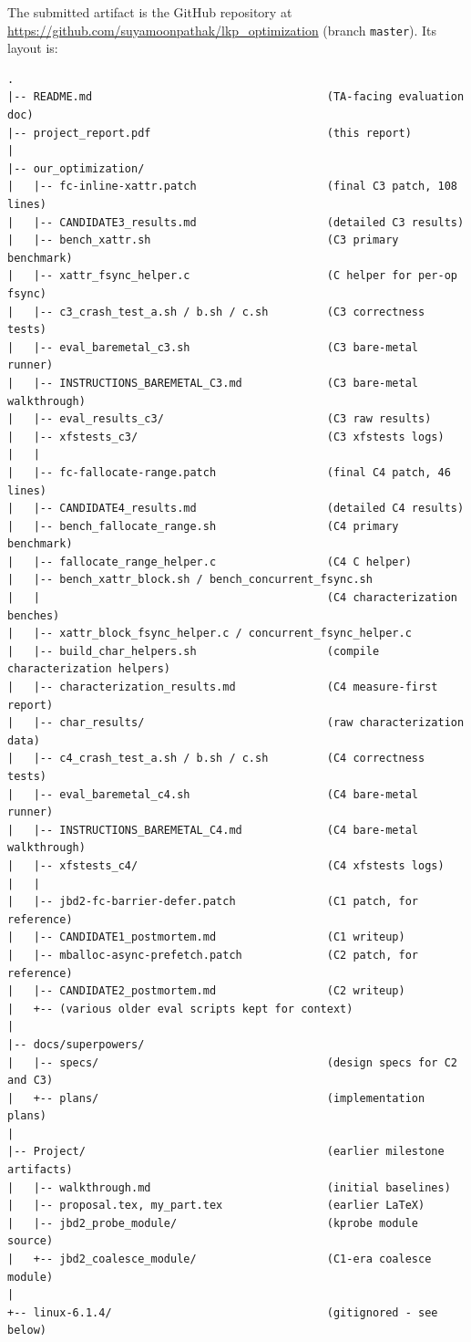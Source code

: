 \documentclass[11pt,a4paper]{article}
\begin{document}
The submitted artifact is the GitHub repository at
\url{https://github.com/suyamoonpathak/lkp_optimization}
(branch \texttt{master}). Its layout is:

\begin{lstlisting}[basicstyle=\ttfamily\scriptsize]
.
|-- README.md                                    (TA-facing evaluation doc)
|-- project_report.pdf                           (this report)
|
|-- our_optimization/
|   |-- fc-inline-xattr.patch                    (final C3 patch, 108 lines)
|   |-- CANDIDATE3_results.md                    (detailed C3 results)
|   |-- bench_xattr.sh                           (C3 primary benchmark)
|   |-- xattr_fsync_helper.c                     (C helper for per-op fsync)
|   |-- c3_crash_test_a.sh / b.sh / c.sh         (C3 correctness tests)
|   |-- eval_baremetal_c3.sh                     (C3 bare-metal runner)
|   |-- INSTRUCTIONS_BAREMETAL_C3.md             (C3 bare-metal walkthrough)
|   |-- eval_results_c3/                         (C3 raw results)
|   |-- xfstests_c3/                             (C3 xfstests logs)
|   |
|   |-- fc-fallocate-range.patch                 (final C4 patch, 46 lines)
|   |-- CANDIDATE4_results.md                    (detailed C4 results)
|   |-- bench_fallocate_range.sh                 (C4 primary benchmark)
|   |-- fallocate_range_helper.c                 (C4 C helper)
|   |-- bench_xattr_block.sh / bench_concurrent_fsync.sh
|   |                                            (C4 characterization benches)
|   |-- xattr_block_fsync_helper.c / concurrent_fsync_helper.c
|   |-- build_char_helpers.sh                    (compile characterization helpers)
|   |-- characterization_results.md              (C4 measure-first report)
|   |-- char_results/                            (raw characterization data)
|   |-- c4_crash_test_a.sh / b.sh / c.sh         (C4 correctness tests)
|   |-- eval_baremetal_c4.sh                     (C4 bare-metal runner)
|   |-- INSTRUCTIONS_BAREMETAL_C4.md             (C4 bare-metal walkthrough)
|   |-- xfstests_c4/                             (C4 xfstests logs)
|   |
|   |-- jbd2-fc-barrier-defer.patch              (C1 patch, for reference)
|   |-- CANDIDATE1_postmortem.md                 (C1 writeup)
|   |-- mballoc-async-prefetch.patch             (C2 patch, for reference)
|   |-- CANDIDATE2_postmortem.md                 (C2 writeup)
|   +-- (various older eval scripts kept for context)
|
|-- docs/superpowers/
|   |-- specs/                                   (design specs for C2 and C3)
|   +-- plans/                                   (implementation plans)
|
|-- Project/                                     (earlier milestone artifacts)
|   |-- walkthrough.md                           (initial baselines)
|   |-- proposal.tex, my_part.tex                (earlier LaTeX)
|   |-- jbd2_probe_module/                       (kprobe module source)
|   +-- jbd2_coalesce_module/                    (C1-era coalesce module)
|
+-- linux-6.1.4/                                 (gitignored - see below)
\end{lstlisting}
\end{document}
